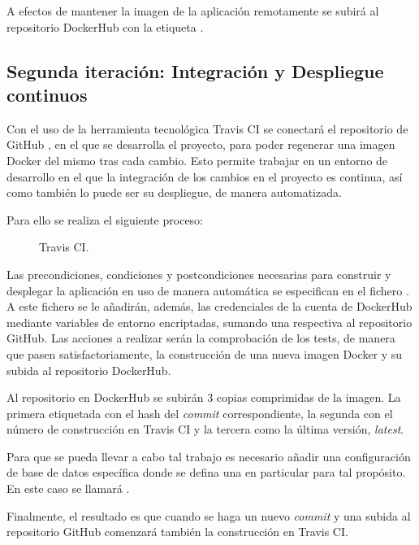 A efectos de mantener la imagen de la aplicación remotamente se subirá al repositorio DockerHub con la etiqueta .

\subsection{Segunda iteración: Integración y Despliegue continuos}

Con el uso de la herramienta tecnológica Travis CI se conectará el repositorio de GitHub , en el que se desarrolla el proyecto, para poder regenerar una imagen Docker del mismo tras cada cambio. Esto permite trabajar en un entorno de desarrollo en el que la integración de los cambios en el proyecto es continua, así como también lo puede ser su despliegue, de manera automatizada.

Para ello se realiza el siguiente proceso:
\begin{figure}[H]
\caption{Travis CI.\label{fig:figure_placement_example}}
\end{figure}

Las precondiciones, condiciones y postcondiciones necesarias para construir y desplegar la aplicación en uso de manera automática se especifican en el fichero . A este fichero se le añadirán, además, las credenciales de la cuenta de DockerHub mediante variables de entorno encriptadas, sumando una respectiva al repositorio GitHub. Las acciones a realizar serán la comprobación de los tests, de manera que pasen satisfactoriamente, la construcción de una nueva imagen Docker y su subida al repositorio DockerHub.

Al repositorio en DockerHub se subirán 3 copias comprimidas de la imagen. La primera etiquetada con el hash del \textit{commit} correspondiente, la segunda con el número de construcción en Travis CI y la tercera como la última versión, \textit{latest}.

Para que se pueda llevar a cabo tal trabajo es necesario añadir una configuración de base de datos específica donde se defina una en particular para tal propósito. En este caso se llamará .

Finalmente, el resultado es que cuando se haga un nuevo \textit{commit} y una subida al repositorio GitHub comenzará también la construcción en Travis CI.

